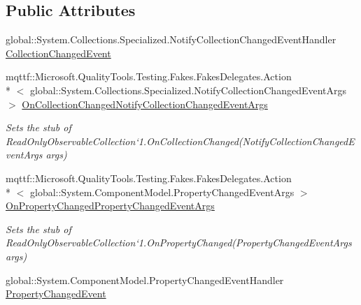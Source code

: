\subsection*{Public Attributes}
\begin{DoxyCompactItemize}
\item 
global\-::\-System.\-Collections.\-Specialized.\-Notify\-Collection\-Changed\-Event\-Handler \hyperlink{class_system_1_1_collections_1_1_object_model_1_1_fakes_1_1_stub_read_only_observable_collection_3_01_t_01_4_a479d16825f3f245b9328417b7f4f1f6e}{Collection\-Changed\-Event}
\item 
mqttf\-::\-Microsoft.\-Quality\-Tools.\-Testing.\-Fakes.\-Fakes\-Delegates.\-Action\\*
$<$ global\-::\-System.\-Collections.\-Specialized.\-Notify\-Collection\-Changed\-Event\-Args $>$ \hyperlink{class_system_1_1_collections_1_1_object_model_1_1_fakes_1_1_stub_read_only_observable_collection_3_01_t_01_4_a9f258688929caa357d7e1d35537765bd}{On\-Collection\-Changed\-Notify\-Collection\-Changed\-Event\-Args}
\begin{DoxyCompactList}\small\item\em Sets the stub of Read\-Only\-Observable\-Collection`1.On\-Collection\-Changed(\-Notify\-Collection\-Changed\-Event\-Args args)\end{DoxyCompactList}\item 
mqttf\-::\-Microsoft.\-Quality\-Tools.\-Testing.\-Fakes.\-Fakes\-Delegates.\-Action\\*
$<$ global\-::\-System.\-Component\-Model.\-Property\-Changed\-Event\-Args $>$ \hyperlink{class_system_1_1_collections_1_1_object_model_1_1_fakes_1_1_stub_read_only_observable_collection_3_01_t_01_4_a75b102c4cf3eb66137fcd5eeef918c44}{On\-Property\-Changed\-Property\-Changed\-Event\-Args}
\begin{DoxyCompactList}\small\item\em Sets the stub of Read\-Only\-Observable\-Collection`1.On\-Property\-Changed(\-Property\-Changed\-Event\-Args args)\end{DoxyCompactList}\item 
global\-::\-System.\-Component\-Model.\-Property\-Changed\-Event\-Handler \hyperlink{class_system_1_1_collections_1_1_object_model_1_1_fakes_1_1_stub_read_only_observable_collection_3_01_t_01_4_afae465e51ed5f9f53512907476fbdb98}{Property\-Changed\-Event}
\end{DoxyCompactItemize}
